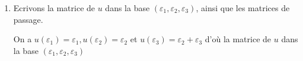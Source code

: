 {{\begin {enumerate}
\begin {enumerate}
D\'eterminons un vecteur propre $\varepsilon_1$ de $u$ non colin\'eaire \`a $\varepsilon_2$.
$$A\begin{pmatrix}x \\  y \\  z\end{pmatrix}
=\begin{pmatrix}x \\  y \\  z\end{pmatrix}\iff\left\{\begin{align*}3x+2y-2z &= x \\  -x+z &=y \\  x+y &=z\end{align*}\right.\iff x+y-z=0.$$
On peut prendre le vecteur $\varepsilon_1=(0,1,1)$ qui n'est pas colin\'eaire \`a $\varepsilon_2$.

    \item   Ecrivons la matrice de $u$ dans la base $(\varepsilon_1,\varepsilon_2,\varepsilon_3)$, ainsi que les matrices de passage.

On a $u(\varepsilon_1)=\varepsilon_1,u(\varepsilon_2)=\varepsilon_2$ et $u(\varepsilon_3)=\varepsilon_2+\varepsilon_3$ d'o\`u la matrice de $u$ dans la base $(\varepsilon_1,\varepsilon_2,\varepsilon_3)$


\end{enumerate}
\end{enumerate}}}
